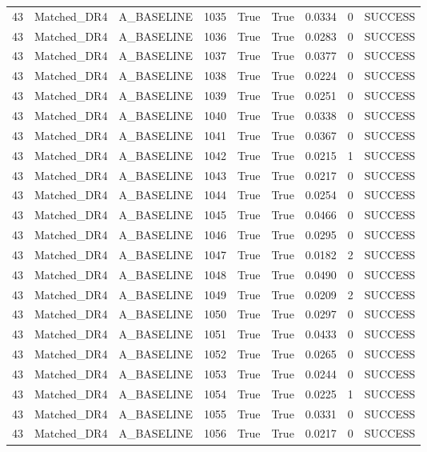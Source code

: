 \documentclass[11pt,a4paper,oneside]{book}
\begin{document}
\begin{longtable}{l l l l l l l l l}
43 & Matched\_DR4 & A\_BASELINE & 1035 & True & True & 0.0334 & 0 & SUCCESS \\
43 & Matched\_DR4 & A\_BASELINE & 1036 & True & True & 0.0283 & 0 & SUCCESS \\
43 & Matched\_DR4 & A\_BASELINE & 1037 & True & True & 0.0377 & 0 & SUCCESS \\
43 & Matched\_DR4 & A\_BASELINE & 1038 & True & True & 0.0224 & 0 & SUCCESS \\
43 & Matched\_DR4 & A\_BASELINE & 1039 & True & True & 0.0251 & 0 & SUCCESS \\
43 & Matched\_DR4 & A\_BASELINE & 1040 & True & True & 0.0338 & 0 & SUCCESS \\
43 & Matched\_DR4 & A\_BASELINE & 1041 & True & True & 0.0367 & 0 & SUCCESS \\
43 & Matched\_DR4 & A\_BASELINE & 1042 & True & True & 0.0215 & 1 & SUCCESS \\
43 & Matched\_DR4 & A\_BASELINE & 1043 & True & True & 0.0217 & 0 & SUCCESS \\
43 & Matched\_DR4 & A\_BASELINE & 1044 & True & True & 0.0254 & 0 & SUCCESS \\
43 & Matched\_DR4 & A\_BASELINE & 1045 & True & True & 0.0466 & 0 & SUCCESS \\
43 & Matched\_DR4 & A\_BASELINE & 1046 & True & True & 0.0295 & 0 & SUCCESS \\
43 & Matched\_DR4 & A\_BASELINE & 1047 & True & True & 0.0182 & 2 & SUCCESS \\
43 & Matched\_DR4 & A\_BASELINE & 1048 & True & True & 0.0490 & 0 & SUCCESS \\
43 & Matched\_DR4 & A\_BASELINE & 1049 & True & True & 0.0209 & 2 & SUCCESS \\
43 & Matched\_DR4 & A\_BASELINE & 1050 & True & True & 0.0297 & 0 & SUCCESS \\
43 & Matched\_DR4 & A\_BASELINE & 1051 & True & True & 0.0433 & 0 & SUCCESS \\
43 & Matched\_DR4 & A\_BASELINE & 1052 & True & True & 0.0265 & 0 & SUCCESS \\
43 & Matched\_DR4 & A\_BASELINE & 1053 & True & True & 0.0244 & 0 & SUCCESS \\
43 & Matched\_DR4 & A\_BASELINE & 1054 & True & True & 0.0225 & 1 & SUCCESS \\
43 & Matched\_DR4 & A\_BASELINE & 1055 & True & True & 0.0331 & 0 & SUCCESS \\
43 & Matched\_DR4 & A\_BASELINE & 1056 & True & True & 0.0217 & 0 & SUCCESS \\

\end{longtable}
\end{document}
